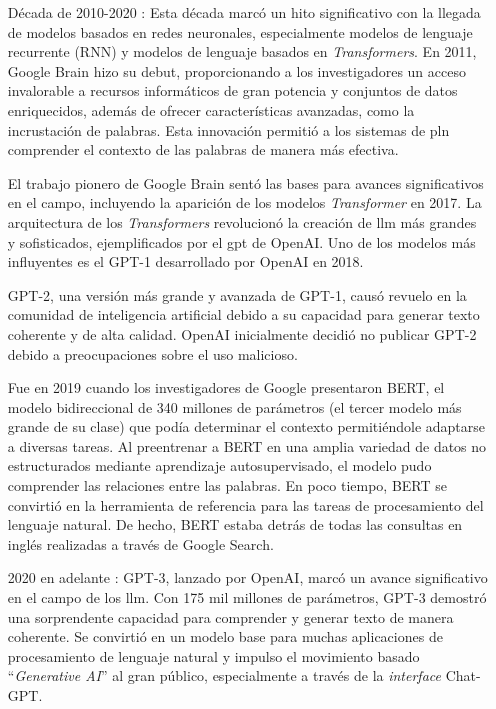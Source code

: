 \begin{itemize}
\item[Década de 2010-2020]: Esta década marcó un hito significativo con la llegada de modelos basados en redes neuronales, especialmente modelos de lenguaje recurrente (RNN) y modelos de lenguaje basados en \textit{Transformers}. En 2011, Google Brain hizo su debut, proporcionando a los investigadores un acceso invalorable a recursos informáticos de gran potencia y conjuntos de datos enriquecidos, además de ofrecer características avanzadas, como la incrustación de palabras. Esta innovación permitió a los sistemas de \acrlong{pln} comprender el contexto de las palabras de manera más efectiva. 

El trabajo pionero de Google Brain sentó las bases para avances significativos en el campo, incluyendo la aparición de los modelos \textit{Transformer} en 2017. La arquitectura de los \textit{Transformers} revolucionó la creación de \acrfull{llm} más grandes y sofisticados, ejemplificados por el \acrfull{gpt} de OpenAI. Uno de los modelos más influyentes es el GPT-1 desarrollado por OpenAI en 2018.

GPT-2, una versión más grande y avanzada de GPT-1, causó revuelo en la comunidad de inteligencia artificial debido a su capacidad para generar texto coherente y de alta calidad. OpenAI inicialmente decidió no publicar GPT-2 debido a preocupaciones sobre el uso malicioso. 

Fue en 2019 cuando los investigadores de Google presentaron BERT, el modelo bidireccional de 340 millones de parámetros (el tercer modelo más grande de su clase) que podía determinar el contexto permitiéndole adaptarse a diversas tareas. Al preentrenar a BERT en una amplia variedad de datos no estructurados mediante aprendizaje autosupervisado, el modelo pudo comprender las relaciones entre las palabras. En poco tiempo, BERT se convirtió en la herramienta de referencia para las tareas de procesamiento del lenguaje natural. De hecho, BERT estaba detrás de todas las consultas en inglés realizadas a través de Google Search.

\item[2020 en adelante]: GPT-3, lanzado por OpenAI, marcó un avance significativo en el campo de los \acrshort{llm}. Con 175 mil millones de parámetros, GPT-3 demostró una sorprendente capacidad para comprender y generar texto de manera coherente. Se convirtió en un modelo base para muchas aplicaciones de procesamiento de lenguaje natural y impulso el movimiento basado ``\textit{Generative AI}'' al gran público, especialmente a través de la \textit{interface} Chat-GPT.


\end{itemize}
